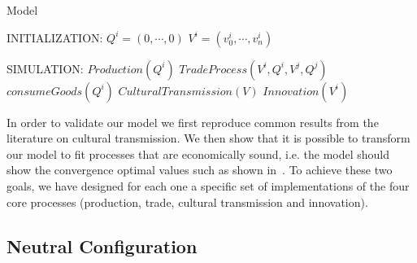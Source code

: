 \documentclass{wscpaperproc}
\begin{document}
\begin{algorithm}
\caption{Model}
\label{algo:complete}
	\begin{algorithmic}[1]
	\scriptsize
	\State INITIALIZATION: 
		 
				\State $Q^i = (0, \cdots, 0)$
				\State $V^i = (v^i_0, \cdots, v^i_n)$ 
		\EndFor

	\State SIMULATION:
				\State $Production(Q^i)$
			\EndFor
					\State $TradeProcess(V^i,Q^i,V^j,Q^j)$
				\EndFor		
			\EndFor
				\State $consumeGoods(Q^i)$ 
					\State $CulturalTransmission(V)$
					\State $Innovation(V^i)$
				\EndIf
			\EndFor
		\EndLoop
\end{algorithmic}
\end{algorithm}


In order to validate our model we first reproduce common results from the literature on cultural transmission. We then show that it is possible to transform our model to fit processes that are economically sound, i.e. the model should show the convergence optimal values such as shown in~\cite{gintis_emergence_2006}. To achieve these two goals, we have designed for each one a specific set of implementations of the four core processes (production, trade, cultural transmission and innovation). 


\subsection{Neutral Configuration}\label{sec:culturalTrans}
\end{document}
